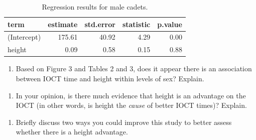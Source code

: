 \documentclass[]{book}
\providecommand{\tightlist}{%
  \setlength{\itemsep}{0pt}\setlength{\parskip}{0pt}}
\begin{document}
\begin{table}

\caption{\label{tab:unnamed-chunk-26}Regression results for male cadets.}
\centering
\begin{tabular}[t]{l|r|r|r|r}
\hline
term & estimate & std.error & statistic & p.value\\
\hline
(Intercept) & 175.61 & 40.92 & 4.29 & 0.00\\
\hline
height & 0.09 & 0.58 & 0.15 & 0.88\\
\hline
\end{tabular}
\end{table}

\begin{enumerate}
\def\labelenumi{\arabic{enumi}.}
\setcounter{enumi}{13}
\tightlist
\item
  Based on Figure 3 and Tables 2 and 3, does it appear there is an association between IOCT time and height within levels of sex? Explain.
\end{enumerate}

\vspace{1in}

\newpage

\begin{enumerate}
\def\labelenumi{\arabic{enumi}.}
\setcounter{enumi}{14}
\tightlist
\item
  In your opinion, is there much evidence that height is an advantage on the IOCT (in other words, is height the \emph{cause} of better IOCT times)? Explain.
\end{enumerate}

\vspace{2in}

\begin{enumerate}
\def\labelenumi{\arabic{enumi}.}
\setcounter{enumi}{15}
\tightlist
\item
  Briefly discuss two ways you could improve this study to better assess whether there is a height advantage.
\end{enumerate}

\vspace{1in}


\end{document}
